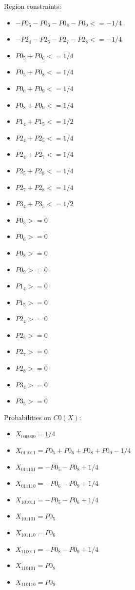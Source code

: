\documentclass[11pt]{article}
\begin{document}
Region constraints:
\begin{itemize}
    \item $-P0_5 - P0_6 - P0_8 - P0_9 <= -1/4$
    \item $-P2_4 - P2_5 - P2_7 - P2_8 <= -1/4$
    \item $P0_5 + P0_6 <= 1/4$
    \item $P0_5 + P0_8 <= 1/4$
    \item $P0_6 + P0_9 <= 1/4$
    \item $P0_8 + P0_9 <= 1/4$
    \item $P1_4 + P1_5 <= 1/2$
    \item $P2_4 + P2_5 <= 1/4$
    \item $P2_4 + P2_7 <= 1/4$
    \item $P2_5 + P2_8 <= 1/4$
    \item $P2_7 + P2_8 <= 1/4$
    \item $P3_4 + P3_5 <= 1/2$
    \item $P0_5 >= 0$
    \item $P0_6 >= 0$
    \item $P0_8 >= 0$
    \item $P0_9 >= 0$
    \item $P1_4 >= 0$
    \item $P1_5 >= 0$
    \item $P2_4 >= 0$
    \item $P2_5 >= 0$
    \item $P2_7 >= 0$
    \item $P2_8 >= 0$
    \item $P3_4 >= 0$
    \item $P3_5 >= 0$
\end{itemize}

Probabilities on $C0 (X)$:
\begin{itemize}
    \item $X_{000000} = 1/4$
    \item $X_{011011} = P0_5 + P0_6 + P0_8 + P0_9 - 1/4$
    \item $X_{011101} = -P0_5 - P0_8 + 1/4$
    \item $X_{011110} = -P0_6 - P0_9 + 1/4$
    \item $X_{101011} = -P0_5 - P0_6 + 1/4$
    \item $X_{101101} = P0_5$
    \item $X_{101110} = P0_6$
    \item $X_{110011} = -P0_8 - P0_9 + 1/4$
    \item $X_{110101} = P0_8$
    \item $X_{110110} = P0_9$
\end{itemize}
\end{document}
